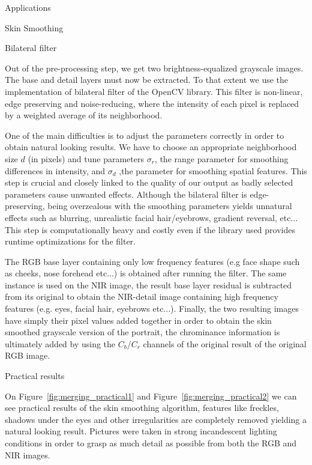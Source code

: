 \documentclass[10pt]{article}
\begin{document}
\begin{section}{Applications}
\begin{subsection}{Skin Smoothing}
        \begin{subsubsection}{Bilateral filter}

            Out of the pre-processing step, we get two brightness-equalized grayscale images. The base and detail layers must now be extracted. To that extent we use the implementation of bilateral filter of the OpenCV library. This filter is non-linear, edge preserving and noise-reducing, where the intensity of each pixel is replaced by a weighted average of its neighborhood.

            \medskip

            One of the main difficulties is to adjust the parameters correctly in order to obtain natural looking results. We have to choose an appropriate neighborhood size $d$ (in pixels) and tune parameters $\sigma_r$, the range parameter for smoothing differences in intensity, and $\sigma_d$ ,the parameter for smoothing spatial features. This step is crucial and closely linked to the quality of our output as badly selected parameters cause unwanted effects. Although the bilateral filter is edge-preserving, being overzealous with the smoothing parameters yields unnatural effects such as blurring, unrealistic facial hair/eyebrows, gradient reversal, etc... This step is computationally heavy and costly even if the library used provides runtime optimizations for the filter.

            \medskip

            The RGB base layer containing only low frequency features (e.g face shape such as cheeks, nose forehead etc...) is obtained after running the filter. The same instance is used on the NIR image, the result base layer residual is subtracted from its original to obtain the NIR-detail image containing high frequency features (e.g. eyes, facial hair, eyebrows etc...). Finally, the two resulting images have simply their pixel values added together in order to obtain the skin smoothed grayscale version of the portrait, the chrominance information is ultimately added by using the $C_b$/$C_r$ channels of the original result of the original RGB image.

        \end{subsubsection}

        \begin{subsubsection}{Practical results}

            On Figure~\ref{fig:merging_practical1} and Figure~\ref{fig:merging_practical2}  we can see practical results of the skin smoothing algorithm, features like freckles, shadows under the eyes and other irregularities are completely removed yielding a natural looking result. Pictures were taken in strong incandescent lighting conditions in order to grasp as much detail as possible from both the RGB and NIR images.


\end{subsubsection}
\end{subsection}
\end{section}
\end{document}
